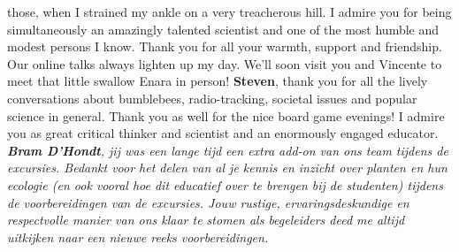 \documentclass[10pt, twoside]{book} %
\begin{document}
\begin{small}
those, when I strained my ankle on a very treacherous hill. I admire you for being simultaneously an amazingly talented scientist and one of the most humble and modest persons I know. Thank you for all your warmth, support and friendship. Our online talks always lighten up my day. We'll soon visit you and Vincente to meet that little swallow Enara in person! \textbf{Steven}, thank you for all the lively conversations about bumblebees, radio-tracking, societal issues and popular science in general. Thank you as well for the nice board game evenings! I admire you as great critical thinker and scientist and an enormously engaged educator. \textit{\textbf{Bram D'Hondt}, jij was een lange tijd een extra add-on van ons team tijdens de excursies. Bedankt voor het delen van al je kennis en inzicht over planten en hun ecologie (en ook vooral hoe dit educatief over te brengen bij de studenten) tijdens de voorbereidingen van de excursies. Jouw rustige, ervaringsdeskundige en respectvolle manier van ons klaar te stomen als begeleiders deed me altijd uitkijken naar een nieuwe reeks voorbereidingen.}\\


\end{small}
\end{document}
